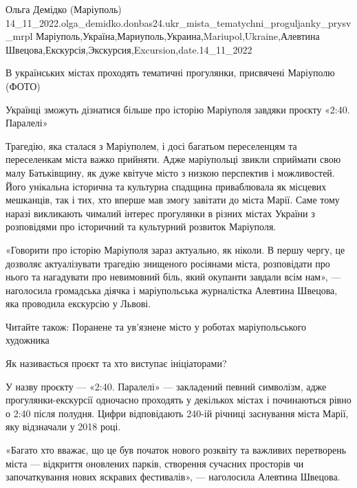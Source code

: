  
 
 
 
 

Ольга Демідко (Маріуполь)
14_11_2022.olga_demidko.donbas24.ukr_mista_tematychni_proguljanky_prysv_mrpl
Маріуполь,Україна,Мариуполь,Украина,Mariupol,Ukraine,Алевтина Швецова,Екскурсія,Экскурсия,Excursion,date.14_11_2022

В українських містах проходять тематичні прогулянки, присвячені Маріуполю (ФОТО)

Українці зможуть дізнатися більше про історію Маріуполя завдяки проєкту «2:40. Паралелі»

Трагедію, яка сталася з Маріуполем, і досі багатьом переселенцям та
переселенкам міста важко прийняти. Адже маріупольці звикли сприймати свою малу
Батьківщину, як дуже квітуче місто з низкою перспектив і можливостей. Його
унікальна історична та культурна спадщина приваблювала як місцевих мешканців,
так і тих, хто вперше мав змогу завітати до міста Марії. Саме тому наразі
викликають чималий інтерес прогулянки в різних містах України з розповідями про
історичний та культурний розвиток Маріуполя.

«Говорити про історію Маріуполя зараз актуально, як ніколи. В першу чергу, це
дозволяє актуалізувати трагедію знищеного росіянами міста, розповідати про
нього та нагадувати про невимовний біль, який окупанти завдали всім нам», —
наголосила громадська діячка і маріупольська журналістка Алевтина Швецова, яка
проводила екскурсію у Львові.

Читайте також: Поранене та ув'язнене місто у роботах маріупольського художника

Як називається проєкт та хто виступає ініціаторами?

У назву проєкту — «2:40. Паралелі» — закладений певний символізм, адже
прогулянки-екскурсії одночасно проходять у декількох містах і починаються рівно
о 2:40 після полудня. Цифри відповідають 240-ій річниці заснування міста Марії,
яку відзначали у 2018 році.

«Багато хто вважає, що це був початок нового розквіту та важливих перетворень
міста — відкриття оновлених парків, створення сучасних просторів чи
започаткування нових яскравих фестивалів», — наголосила Алевтина Швецова.

